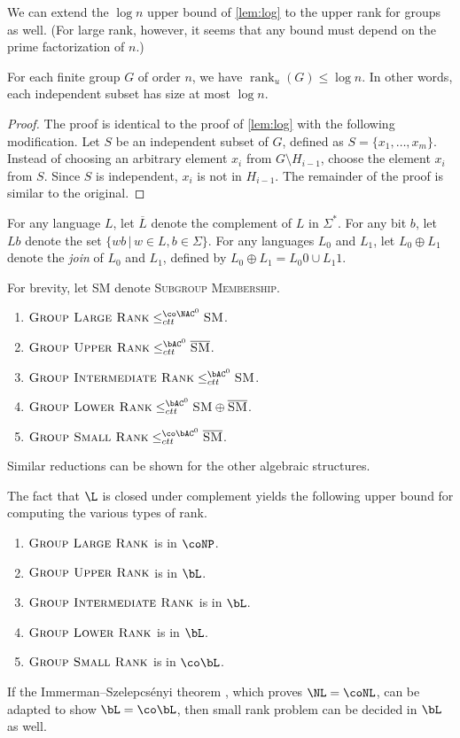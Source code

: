 \documentclass{article}
\DeclareMathOperator{\rank}{rank}
\begin{document}
We can extend the $\log n$ upper bound of \autoref{lem:log} to the upper rank for groups as well.
(For large rank, however, it seems that any bound must depend on the prime factorization of $n$.)
\begin{lemma}\label{lem:logind}
  For each finite group $G$ of order $n$, we have $\rank_u(G) \leq \log n$.
  In other words, each independent subset has size at most $\log n$.
\end{lemma}
\begin{proof}
  The proof is identical to the proof of \autoref{lem:log} with the following modification.
  Let $S$ be an independent subset of $G$, defined as $S = \{x_1, \dotsc, x_m\}$.
  Instead of choosing an arbitrary element $x_i$ from $G \setminus H_{i - 1}$, choose the element $x_i$ from $S$.
  Since $S$ is independent, $x_i$ is not in $H_{i - 1}$.
  The remainder of the proof is similar to the original.
\end{proof}

For any language $L$, let $\overline{L}$ denote the complement of $L$ in $\Sigma^*$.
For any bit $b$, let $Lb$ denote the set $\{ wb \, | \, w \in L, b \in \Sigma\}$.
For any languages $L_0$ and $L_1$, let $L_0 \oplus L_1$ denote the \emph{join} of $L_0$ and $L_1$, defined by $L_0 \oplus L_1 = L_0 0 \cup L_1 1$.

\begin{lemma}
  For brevity, let \textsc{SM} denote \textsc{Subgroup Membership}.
  \mbox{}
  \begin{enumerate}
  \item $\textsc{Group Large Rank} \leq_{ctt}^{\co\NAC^0} \textsc{SM}$.
  \item $\textsc{Group Upper Rank} \leq_{ctt}^{\bAC^0} \overline{\textsc{SM}}$.
  \item $\textsc{Group Intermediate Rank} \leq_{ctt}^{\bAC^0} \textsc{SM}$.
  \item $\textsc{Group Lower Rank} \leq_{ctt}^{\bAC^0} \textsc{SM} \oplus \overline{\textsc{SM}}$.
  \item $\textsc{Group Small Rank} \leq_{ctt}^{\co\bAC^0} \overline{\textsc{SM}}$.
  \end{enumerate}
\end{lemma}

Similar reductions can be shown for the other algebraic structures.

The fact that $\L$ is closed under complement yields the following upper bound for computing the various types of rank.

\begin{theorem}
  \mbox{}
  \begin{enumerate}
  \item $\textsc{Group Large Rank}$ is in $\coNP$.
  \item $\textsc{Group Upper Rank}$ is in $\bL$.
  \item $\textsc{Group Intermediate Rank}$ is in $\bL$.
  \item $\textsc{Group Lower Rank}$ is in $\bL$.
  \item $\textsc{Group Small Rank}$ is in $\co\bL$.
  \end{enumerate}
\end{theorem}

If the Immerman–Szelepcsényi theorem \autocite{immerman88, szelepcsenyi88}, which proves $\NL = \coNL$, can be adapted to show $\bL = \co\bL$, then small rank problem can be decided in $\bL$ as well.

\printbibliography
\end{document}
